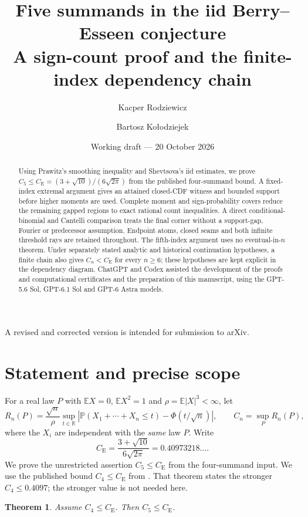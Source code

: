 \documentclass[11pt,a4paper]{article}
\title{Five summands in the iid Berry--Esseen conjecture\\
\large A sign-count proof and the finite-index dependency chain}
\author{Kacper Rodziewicz \and Bartosz Ko{\l}odziejek}
\date{Working draft --- 20 October 2026}
\newtheorem{theorem}{Theorem}
\theoremstyle{definition}
\newcommand{\E}{\mathbb E}
\newcommand{\Pp}{\mathbb P}
\newcommand{\CE}{C_{\mathrm E}}
\begin{document}
\maketitle
\begin{center}\small
A revised and corrected version is intended for submission to arXiv.
\end{center}
\begin{abstract}
Using Prawitz's smoothing inequality and Shevtsova's iid estimates, we prove
\(C_5\le C_{\mathrm E}=(3+\sqrt{10})/(6\sqrt{2\pi})\) from the published
four-summand bound. A fixed-index extremal argument gives an attained
closed-CDF witness and bounded support before higher moments are used.
Complete moment and sign-probability covers reduce the remaining gapped
regions to exact rational count inequalities. A direct conditional-binomial
and Cantelli comparison treats the final corner without a support-gap,
Fourier or predecessor assumption. Endpoint atoms, closed seams and both
infinite threshold rays are retained throughout. The fifth-index argument
uses no eventual-in-\(n\) theorem. Under separately stated analytic and
historical continuation hypotheses, a finite chain also gives
\(C_n<C_{\mathrm E}\) for every \(n\ge6\); these hypotheses are kept explicit
in the dependency diagram. ChatGPT and Codex assisted the development of
the proofs and computational certificates and the preparation of this
manuscript, using the GPT-5.6 Sol, GPT-6.1 Sol and GPT-6 Astra models.
\end{abstract}

\section{Statement and precise scope}
For a real law $P$ with $\E X=0$, $\E X^2=1$ and $\rho=\E|X|^3<\infty$, let
\[
 R_n(P)=\frac{\sqrt n}{\rho}\sup_{t\in\mathbb R}
 \left|\Pp(X_1+\cdots+X_n\le t)-\Phi(t/\sqrt n)\right|,
 \qquad C_n=\sup_P R_n(P),
\]
where the $X_i$ are independent with the \emph{same} law $P$. Write
\[
 \CE=\frac{3+\sqrt{10}}{6\sqrt{2\pi}}
       =0.40973218\ldots.
\]
We prove the unrestricted assertion $C_5\le\CE$ from the four-summand input.
We use the published bound $C_4\le\CE$ from
\cite[Theorem~26.1, p.~174]{RK}. That theorem states the stronger
$C_4\le0.4097$; the stronger value is not needed here.

\begin{theorem}\label{thm:composition}
Assume $C_4\le\CE$. Then $C_5\le\CE$.
\end{theorem}
\end{document}
